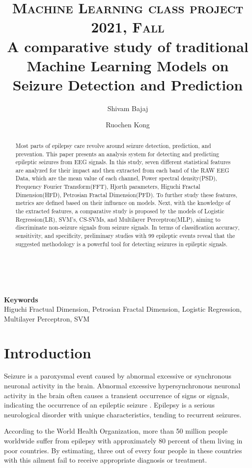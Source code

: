 \documentclass[10pt,twocolumn,letterpaper]{article}
\title{
		\usefont{OT1}{bch}{b}{n}
		\normalfont \normalsize \textsc{Machine Learning class project 2021, Fall} \\ [10pt]
		\huge A comparative study of traditional Machine Learning Models on Seizure Detection and Prediction  \\
}
\author[1]{Shivam Bajaj}
\author[1]{Ruochen Kong}
\affil[1]{\small{Department of Computer Science, Emory University}}
\begin{document}
\maketitle

\begin{abstract}
Most parts of epilepsy care revolve around seizure detection, prediction, and prevention. This paper presents an analysis system for detecting and predicting epileptic seizures from EEG signals. In this study, seven different statistical features are analyzed for their impact and then extracted from each band of the RAW EEG Data, which are the mean value of each channel, Power spectral density(PSD), Frequency Fourier Transform(FFT), Hjorth parameters, Higuchi Fractal Dimension(HFD), Petrosian Fractal Dimension(PFD). To further study these features, metrics are defined based on their influence on models. Next, with the knowledge of the extracted features, a comparative study is proposed by the models of Logistic Regression(LR), SVM's, CS-SVMs, and Multilayer Perceptron(MLP), aiming to discriminate non-seizure signals from seizure signals. In terms of classification accuracy, sensitivity, and specificity, preliminary studies with 99 epileptic events reveal that the suggested methodology is a powerful tool for detecting seizures in epileptic signals. 
\end{abstract} \\ 
\\ 
{\textbf{Keywords} \\
Higuchi Fractual Dimension, Petrosian Fractal Dimension, Logistic Regression, Multilayer Perceptron, SVM}

\section{Introduction}
Seizure is a paroxysmal event caused by abnormal excessive or synchronous neuronal activity in the brain. Abnormal excessive hypersynchronous neuronal activity in the brain often causes a transient occurrence of signs or signals, indicating the occurrence of an epileptic seizure \cite{intro_2}. Epilepsy is a serious neurological disorder with unique characteristics, tending to recurrent seizures\cite{intro_1}. 

According to the World Health Organization\cite{intro_3}, more than 50 million people worldwide suffer from epilepsy with approximately 80 percent of them living in poor countries. By estimating, three out of every four people in these countries with this ailment fail to receive appropriate diagnosis or treatment. 
\end{document}
